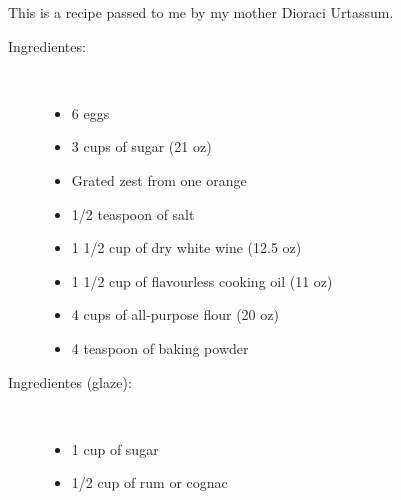 \documentclass[11pt,letterpaper]{article}
\begin{document}


This is a recipe passed to me by my mother Dioraci Urtassum.

\begin{description}

\item[Ingredientes:]\ \\
	\begin{itemize}
	\item 6 eggs
	\item 3 cups of sugar (21 oz)
	\item Grated zest from one orange
	\item 1/2 teaspoon of salt
	\item 1 1/2 cup of dry white wine (12.5 oz)
	\item 1 1/2 cup of flavourless cooking oil (11 oz)
	\item 4 cups of all-purpose flour (20 oz)
	\item 4 teaspoon of baking powder
	\end{itemize}
	
\item[Ingredientes (glaze):]\ \\
	\begin{itemize}
	\item 1 cup of sugar
	\item 1/2 cup of rum or cognac 
	\end{itemize}
	

\end{description}
\end{document}
